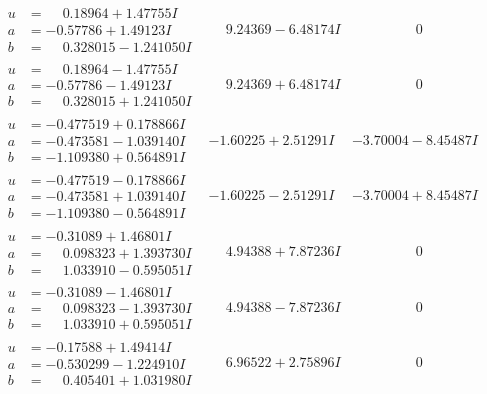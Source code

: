 \documentclass[1p]{elsarticle_modified}
\theoremstyle{definition}
\begin{document}
$$\begin{array}{c|c|c}
\begin{aligned}
u &= \phantom{-}0.18964 + 1.47755 I \\
a &= -0.57786 + 1.49123 I \\
b &= \phantom{-}0.328015 - 1.241050 I\end{aligned}
 & \phantom{-}9.24369 - 6.48174 I & \phantom{-0.000000 } 0 \\ \hline\begin{aligned}
u &= \phantom{-}0.18964 - 1.47755 I \\
a &= -0.57786 - 1.49123 I \\
b &= \phantom{-}0.328015 + 1.241050 I\end{aligned}
 & \phantom{-}9.24369 + 6.48174 I & \phantom{-0.000000 } 0 \\ \hline\begin{aligned}
u &= -0.477519 + 0.178866 I \\
a &= -0.473581 - 1.039140 I \\
b &= -1.109380 + 0.564891 I\end{aligned}
 & -1.60225 + 2.51291 I & -3.70004 - 8.45487 I \\ \hline\begin{aligned}
u &= -0.477519 - 0.178866 I \\
a &= -0.473581 + 1.039140 I \\
b &= -1.109380 - 0.564891 I\end{aligned}
 & -1.60225 - 2.51291 I & -3.70004 + 8.45487 I \\ \hline\begin{aligned}
u &= -0.31089 + 1.46801 I \\
a &= \phantom{-}0.098323 + 1.393730 I \\
b &= \phantom{-}1.033910 - 0.595051 I\end{aligned}
 & \phantom{-}4.94388 + 7.87236 I & \phantom{-0.000000 } 0 \\ \hline\begin{aligned}
u &= -0.31089 - 1.46801 I \\
a &= \phantom{-}0.098323 - 1.393730 I \\
b &= \phantom{-}1.033910 + 0.595051 I\end{aligned}
 & \phantom{-}4.94388 - 7.87236 I & \phantom{-0.000000 } 0 \\ \hline\begin{aligned}
u &= -0.17588 + 1.49414 I \\
a &= -0.530299 - 1.224910 I \\
b &= \phantom{-}0.405401 + 1.031980 I\end{aligned}
 & \phantom{-}6.96522 + 2.75896 I & \phantom{-0.000000 } 0 \\ \hline\begin{aligned}

\end{aligned}
\end{array}$$
\end{document}
